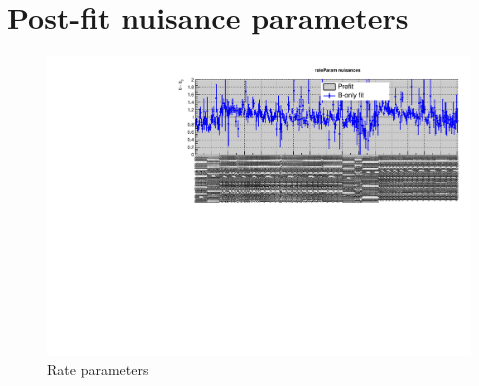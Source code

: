 \section{Post-fit nuisance parameters}
\label{app:results}

%
%


\begin{figure}[h!]
  \centering
  \caption{Rate parameters}
  \includegraphics[width=1.\linewidth]{figures/results/36invfb_preapproval/postfit/nuis/Rates_nuisances}
\end{figure}

